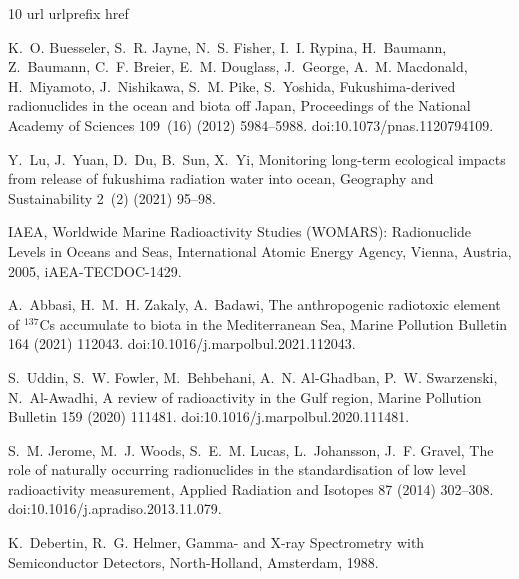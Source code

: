 \documentclass[preprint,12pt]{elsarticle}
\begin{document}
\begin{thebibliography}{10}
\expandafter\ifx\csname url\endcsname\relax
  \def\url#1{\texttt{#1}}\fi
\expandafter\ifx\csname urlprefix\endcsname\relax\def\urlprefix{URL }\fi
\expandafter\ifx\csname href\endcsname\relax
  \def\href#1#2{#2} \def\path#1{#1}\fi

K.~O. Buesseler, S.~R. Jayne, N.~S. Fisher, I.~I. Rypina, H.~Baumann, Z.~Baumann, C.~F. Breier, E.~M. Douglass, J.~George, A.~M. Macdonald, H.~Miyamoto, J.~Nishikawa, S.~M. Pike, S.~Yoshida, Fukushima-derived radionuclides in the ocean and biota off {Japan}, Proceedings of the National Academy of Sciences 109~(16) (2012) 5984--5988.
\newblock \href {https://doi.org/10.1073/pnas.1120794109} {\path{doi:10.1073/pnas.1120794109}}.

Y.~Lu, J.~Yuan, D.~Du, B.~Sun, X.~Yi, Monitoring long-term ecological impacts from release of fukushima radiation water into ocean, Geography and Sustainability 2~(2) (2021) 95--98.

{IAEA}, Worldwide Marine Radioactivity Studies ({WOMARS}): Radionuclide Levels in Oceans and Seas, International Atomic Energy Agency, Vienna, Austria, 2005, iAEA-TECDOC-1429.

A.~Abbasi, H.~M.~H. Zakaly, A.~Badawi, The anthropogenic radiotoxic element of $^{137}${Cs} accumulate to biota in the {Mediterranean Sea}, Marine Pollution Bulletin 164 (2021) 112043.
\newblock \href {https://doi.org/10.1016/j.marpolbul.2021.112043} {\path{doi:10.1016/j.marpolbul.2021.112043}}.

S.~Uddin, S.~W. Fowler, M.~Behbehani, A.~N. Al-Ghadban, P.~W. Swarzenski, N.~Al-Awadhi, A review of radioactivity in the {Gulf} region, Marine Pollution Bulletin 159 (2020) 111481.
\newblock \href {https://doi.org/10.1016/j.marpolbul.2020.111481} {\path{doi:10.1016/j.marpolbul.2020.111481}}.

S.~M. Jerome, M.~J. Woods, S.~E.~M. Lucas, L.~Johansson, J.~F. Gravel, The role of naturally occurring radionuclides in the standardisation of low level radioactivity measurement, Applied Radiation and Isotopes 87 (2014) 302--308.
\newblock \href {https://doi.org/10.1016/j.apradiso.2013.11.079} {\path{doi:10.1016/j.apradiso.2013.11.079}}.

K.~Debertin, R.~G. Helmer, Gamma- and {X}-ray Spectrometry with Semiconductor Detectors, North-Holland, Amsterdam, 1988.



\end{thebibliography}
\end{document}
